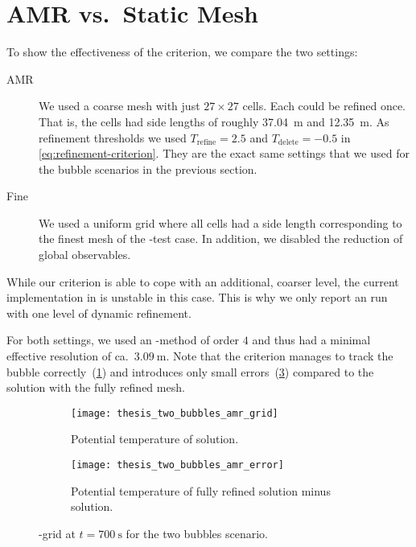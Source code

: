 \section{AMR vs.\ Static Mesh}\label{sec:results-tts-amr}
To show the effectiveness of the \amr{} criterion, we compare the two settings:
\begin{description}
\item[AMR] We used a coarse mesh with just $27 \times 27$ cells.
  Each could be refined once.
  That is, the cells had side lengths of roughly \SI{37.04}{\m} and  \SI{12.35}{\m}.
  As refinement thresholds we used $T_\text{refine} = 2.5$ and $T_\text{delete} = -0.5$ in \cref{eq:refinement-criterion}.
  They are the exact same settings that we used for the bubble scenarios in the previous section.
\item[Fine] We used a uniform grid where all cells had a side length corresponding to the finest mesh of the \amr{}-test case.
  In addition, we disabled the reduction of global observables.
\end{description}
While our \amr{} criterion is able to cope with an additional, coarser level, the current implementation in \exahype{} is unstable in this case.
This is why we only report an \amr{} run with one level of dynamic refinement.

For both settings, we used an \aderdg{}-method of order $4$ and thus had a minimal effective resolution of ca.\ $\SI{3.09}{\m}$.
Note that the \amr{} criterion manages to track the bubble correctly~(\cref{fig:two-bubbles-amr-grid}) and introduces only small errors~(\cref{fig:two-bubbles-amr-error}) compared to the solution with the fully refined mesh.

\begin{figure}[htb]
\centering
\begin{subfigure}[t]{0.45\textwidth}
    \centering
    \texttt{[image: thesis\_two\_bubbles\_amr\_grid]} 
    \caption{\label{fig:two-bubbles-amr-grid}%
      Potential temperature of \amr{} solution.}
\end{subfigure}\qquad%
\begin{subfigure}[t]{0.45\textwidth}
    \centering
    \texttt{[image: thesis\_two\_bubbles\_amr\_error]} 
    \caption{\label{fig:two-bubbles-amr-error}%
      Potential temperature of fully refined solution minus \amr{} solution.}
\end{subfigure}

  \caption{%
    \amr{}-grid at $t = \SI{700}{\s}$ for the two bubbles scenario.}
\end{figure}

